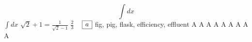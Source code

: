 \documentclass{article}
\begin{document}
\begin{equation}
  \int dx 
\end{equation}
\newpage
$\int dx$
\newpage
$\sqrt2+1=\frac1{\sqrt2-1}$
\newpage
$\frac23$
\newpage
\ 
\newpage
\( \begin{array}{|r|} \hline a \cr \hline \end{array} \)
\newpage
fig, pig, flask, efficiency, effluent
\newpage
\Huge A \LARGE A \Large A \large A \normalsize A \small A
\footnotesize A \scriptsize A \tiny A
\end{document}
